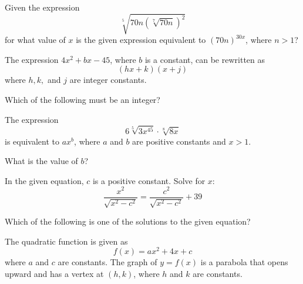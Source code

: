 \noindent\markforreview
\vspace{1em}

Given the expression
\[
\sqrt[5]{70n \left(\sqrt[7]{70n}\right)^2}
\]
for what value of \(x\) is the given expression equivalent to \((70n)^{30x}\), where \(n > 1\)?

\vspace{2em}
\newpage

\noindent\markforreview
\vspace{1em}

The expression \(4x^2 + bx - 45\), where \(b\) is a constant, can be rewritten as
\[
(hx + k)(x + j)
\]
where \(h, k,\) and \(j\) are integer constants.

Which of the following must be an integer?

\vspace{0.75em}


\vspace{2em}
\newpage

\noindent\markforreview
\vspace{1em}

The expression
\[
6\sqrt[5]{3x^{45}} \cdot \sqrt[8]{8x}
\]
is equivalent to \(ax^b\), where \(a\) and \(b\) are positive constants and \(x > 1\).

What is the value of \(b\)?

\vspace{2em}
\newpage

\noindent\markforreview
\vspace{1em}

In the given equation, \(c\) is a positive constant. Solve for \(x\):
\[
\frac{x^2}{\sqrt{x^2 - c^2}} = \frac{c^2}{\sqrt{x^2 - c^2}} + 39
\]

Which of the following is one of the solutions to the given equation?

\vspace{0.75em}


\vspace{2em}
\newpage

\noindent\markforreview
\vspace{1em}

The quadratic function is given as
\[
f(x) = ax^2 + 4x + c
\]
where \(a\) and \(c\) are constants. The graph of \(y = f(x)\) is a parabola that opens upward and has a vertex at \((h, k)\), where \(h\) and \(k\) are constants.

